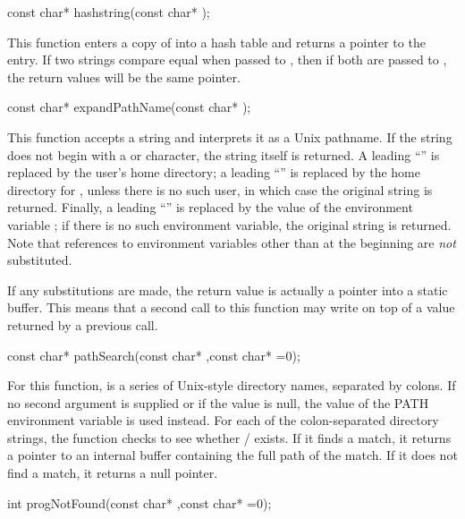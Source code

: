 \begin{example}
const char* hashstring(const char* );
\end{example}

This function enters a copy of  into a hash table and returns
a pointer to the entry.  If two strings compare equal when passed to
, then if both are passed to , the return
values will be the same pointer.

\begin{example}
const char* expandPathName(const char* );
\end{example}

This function accepts a string and interprets it as a Unix pathname.
If the string does not begin with a \code{~} or \code{$} character,
the string itself is returned.  A leading ``\code{~/}'' is replaced
by the user's home directory; a leading ``'' is
replaced by the home directory for , unless there is no
such user, in which case the original string is returned.  Finally,
a leading ``'' is replaced by the value of the
environment variable ; if there is no such environment
variable, the original string is returned.  Note that references
to environment variables other than at the beginning are \emph{not}
substituted.

If any substitutions are made, the return value is actually a pointer
into a static buffer.  This means that a second call to this function
may write on top of a value returned by a previous call.

\begin{example}
const char* pathSearch(const char* ,const char* =0);
\end{example}

For this function,  is a series of Unix-style directory names,
separated by colons.  If no second argument is supplied or if the value
is null, the value of the PATH environment variable is used instead.
For each of the colon-separated directory strings, the function checks
to see whether / exists.  If it finds a match, it
returns a pointer to an internal buffer containing the full path of the
match.  If it does not find a match, it returns a null pointer.

\begin{example}
int progNotFound(const char* ,const char* =0);
\end{example}

